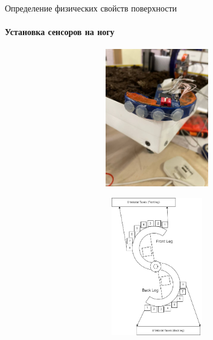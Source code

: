 \documentclass[aspectratio=169,xcolor=table]{beamer}
\begin{document}
\begin{frame}[t]{Определение физических свойств поверхности}
    \framesubtitle{Установка сенсоров на ногу}
    \vspace{-0.7cm}
    \begin{figure}[H]
        \begin{subfigure}{0.49\textwidth}
            \centering\includegraphics[height=6cm,width=1\textwidth,keepaspectratio]{s_shape_leg/socks.jpg}
            \label{fig:s_shape_leg/socks.jpg}
        \end{subfigure}
        \begin{subfigure}{0.49\textwidth}
            \centering\includegraphics[height=6cm,width=1\textwidth,keepaspectratio]{s_shape_leg/leg_design.png}
            \label{fig:s_shape_leg/leg_design.png}
        \end{subfigure}
    \end{figure}
\end{frame}
\end{document}
